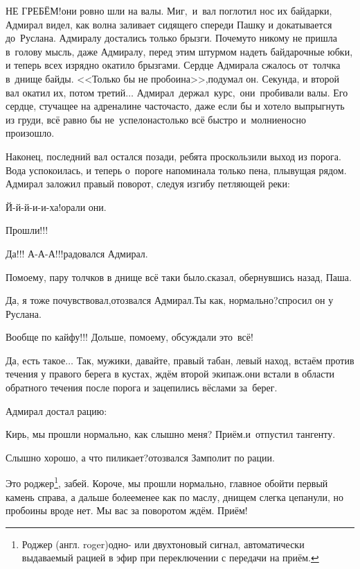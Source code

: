 \diagdash НЕ ГРЕБЁМ!\mdash они ровно шли на валы. Миг,~и~вал поглотил нос их байдарки, Адмирал видел, как волна заливает сидящего спереди Пашку и докатывается до~Руслана. Адмиралу достались только брызги. Почему\sdash то никому не пришла в~голову мысль, даже Адмиралу, перед этим штурмом надеть байдарочные юбки, и теперь всех изрядно окатило брызгами. Сердце Адмирала сжалось от~толчка в~днище байды. <<Только бы не пробоина>>,\mdash подумал он. Секунда, и второй вал окатил их, потом третий$\ldots$ Адмирал~держал~курс,~они~пробивали валы. Его сердце, стучащее на адреналине часто\sdash часто, даже если бы и хотело выпрыгнуть из груди, всё равно бы не~успело\mdash настолько всё быстро и~молниеносно произошло. 

Наконец, последний вал остался позади, ребята проскользили выход из порога. Вода успокоилась, и теперь о~пороге напоминала только пена, плывущая рядом. Адмирал заложил правый поворот, следуя изгибу петляющей реки:

\diagdash Й-й-й-и-и-ха!\mdash орали они.

\diagdash Прошли!!!

\diagdash Да!!! А-А-А!!!\mdash радовался Адмирал.

\diagdash По\sdash моему, пару толчков в днище всё таки было.\mdash сказал, обернувшись назад, Паша. 

\diagdash Да, я тоже почувствовал,\mdash отозвался Адмирал.\mdash Ты как, нормально?\mdash спросил он у Руслана.

\diagdash Вообще по кайфу!!! Дольше, по\sdash моему, обсуждали это~всё!

\diagdash Да, есть такое$\ldots$ Так, мужики, давайте, правый табан, левый наход, встаём против течения у правого берега в кустах, ждём второй экипаж.\mdash они встали в области обратного течения после порога и зацепились вёслами за~берег.

Адмирал достал рацию:

\diagdash Кирь, мы прошли нормально, как слышно меня? Приём.\mdash и~отпустил тангенту.

\diagdash Слышно хорошо, а что пиликает?\mdash отозвался Замполит по рации.

\renewcommand*{\thefootnote}{\fnsymbol{footnote}}
\setcounter{footnote}{0}
\diagdash Это роджер\footnote{Роджер (англ. roger)\mdash одно- или двухтоновый сигнал, автоматически выдаваемый рацией в эфир при переключении с передачи на приём.}, забей. Короче, мы прошли нормально, главное обойти первый камень справа, а дальше более\sdash менее как по маслу, днищем слегка цепанули, но пробоины вроде нет. Мы вас за поворотом ждём. Приём!

